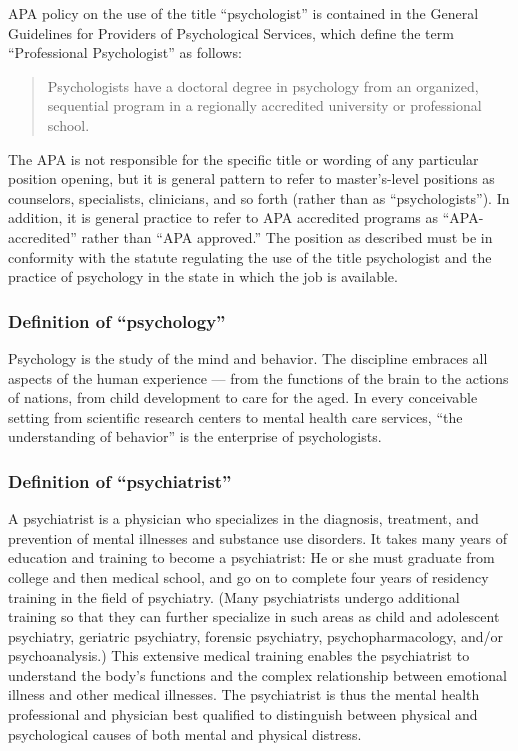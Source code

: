 APA policy on the use of the title ``psychologist'' is contained in the General Guidelines for Providers of Psychological Services, which define the term ``Professional Psychologist'' as follows:

\begin{quote}

Psychologists have a doctoral degree in psychology from an organized, sequential program in a regionally accredited university or professional school.
\end{quote}

The APA is not responsible for the specific title or wording of any particular position opening, but it is general pattern to refer to master's-level positions as counselors, specialists, clinicians, and so forth (rather than as ``psychologists''). In addition, it is general practice to refer to APA accredited programs as ``APA-accredited'' rather than ``APA approved.'' The position as described must be in conformity with the statute regulating the use of the title psychologist and the practice of psychology in the state in which the job is available.

\subsubsection{Definition of ``psychology''}
\label{definitionofpsychology}

Psychology is the study of the mind and behavior. The discipline embraces all aspects of the human experience — from the functions of the brain to the actions of nations, from child development to care for the aged. In every conceivable setting from scientific research centers to mental health care services, ``the understanding of behavior'' is the enterprise of psychologists.

\subsubsection{Definition of “psychiatrist”}
\label{definitionof“psychiatrist”}

A psychiatrist is a physician who specializes in the diagnosis, treatment, and prevention of mental illnesses and substance use disorders. It takes many years of education and training to become a psychiatrist: He or she must graduate from college and then medical school, and go on to complete four years of residency training in the field of psychiatry. (Many psychiatrists undergo additional training so that they can further specialize in such areas as child and adolescent psychiatry, geriatric psychiatry, forensic psychiatry, psychopharmacology, and\slash or psychoanalysis.) This extensive medical training enables the psychiatrist to understand the body's functions and the complex relationship between emotional illness and other medical illnesses. The psychiatrist is thus the mental health professional and physician best qualified to distinguish between physical and psychological causes of both mental and physical distress.

